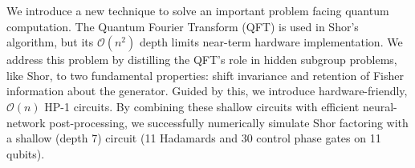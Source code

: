 
We introduce a new technique to solve an important problem facing quantum computation. The Quantum Fourier Transform (QFT) is used in Shor’s algorithm, but its \(\mathcal{O}(n^2)\) depth limits near-term hardware implementation. We address this problem by distilling the QFT’s role in hidden subgroup problems, like Shor, to two fundamental properties: shift invariance and retention of Fisher information about the generator. Guided by this, we introduce hardware-friendly, \(\mathcal{O}(n)\) HP-1 circuits. By combining these shallow circuits with efficient neural-network post-processing, we successfully numerically simulate Shor factoring with a shallow (depth 7) circuit (11 Hadamards and 30 control phase gates on 11 qubits).  